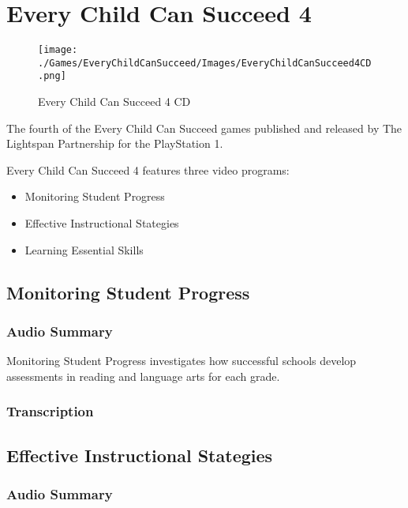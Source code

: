 \chapter{Every Child Can Succeed 4}

\begin{figure}[H]
    \centering
    \texttt{[image: ./Games/EveryChildCanSucceed/Images/EveryChildCanSucceed4CD.png]}
    \caption{Every Child Can Succeed 4 CD}
\end{figure}


The fourth of the Every Child Can Succeed games published and released by The Lightspan Partnership for the PlayStation 1.

Every Child Can Succeed 4 features three video programs:

\begin{itemize}
    \item Monitoring Student Progress
    \item Effective Instructional Stategies
    \item Learning Essential Skills
\end{itemize}

\clearpage
\newpage

\section{Monitoring Student Progress}

\subsection{Audio Summary}

Monitoring Student Progress investigates how successful schools develop assessments in reading and language arts for each grade.

\subsection{Transcription}

\section{Effective Instructional Stategies}

\subsection{Audio Summary}

